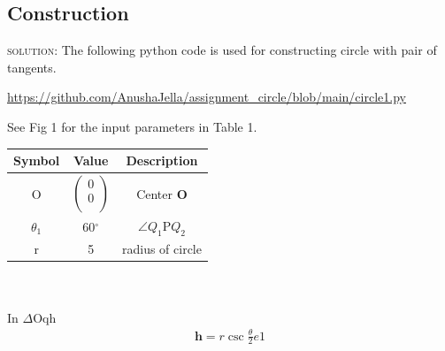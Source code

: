 \documentclass{article}
\let\vec\mathbf
\begin{document}
\begin{multicols}{2}
 \section*{Construction}
 \begin{flushleft}
 \textsc{solution:} The following python code is used for constructing circle with pair of tangents.
 \end{flushleft}
 \begin{mdframed}
   \url{https://github.com/AnushaJella/assignment_circle/blob/main/circle1.py}\\
\end{mdframed}
See Fig 1 for the input parameters in Table 1.\\
{\setlength\extrarowheight{2pt}
\begin{tabular}{|c|c|c|}
	\hline
	\textbf{Symbol}&\textbf{Value}&\textbf{Description}\\
	\hline
	O&$\begin{pmatrix}
	0\\0\\
	\end{pmatrix} $&Center $\vec{O}$\\
	\hline
	$\theta_{1}$&60$^{\circ}$& $\angle$$Q_1$P$Q_2$\\
	\hline
	r&5& radius of circle\\
	\hline
	
\end{tabular}
}\\
\\
\hspace{-6cm}In $\Delta$Oqh 
\begin{align}
	\boldsymbol{h} = r\csc\frac{\theta}{2} e1
\end{align}

\end{multicols}
\end{document}

